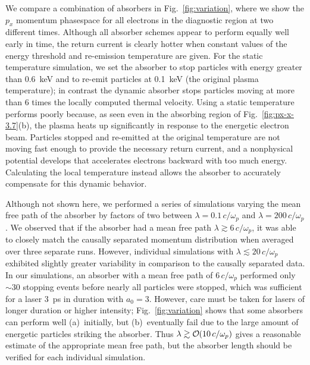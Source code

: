 \documentclass[../absorber.tex]{subfiles}
\begin{document}
We compare a combination of absorbers in Fig.~\ref{fig:variation}, where we show the $p_x$ momentum phasespace for all electrons in the diagnostic region at two different times.  Although all absorber schemes appear to perform equally well early in time, the return current is clearly hotter when constant values of the energy threshold and re-emission temperature are given.  For the static temperature simulation, we set the absorber to stop particles with energy greater than 0.6~keV and to re-emit particles at 0.1~keV (the original plasma temperature); in contrast the dynamic absorber stops particles moving at more than 6 times the locally computed thermal velocity.  Using a static temperature performs poorly because, as seen even in the absorbing region of Fig.~\ref{fig:px-x-3.7}(b), the plasma heats up significantly in response to the energetic electron beam.  Particles stopped and re-emitted at the original temperature are not moving fast enough to provide the necessary return current, and a nonphysical potential develops that accelerates electrons backward with too much energy.  Calculating the local temperature instead allows the absorber to accurately compensate for this dynamic behavior.

Although not shown here, we performed a series of simulations varying the mean free path of the absorber by factors of two between $\lambda=0.1\,c/\omega_p$ and $\lambda=200\,c/\omega_p$.  We observed that if the absorber had a mean free path $\lambda \gtrsim 6\,c/\omega_p$, it was able to closely match the causally separated momentum distribution when averaged over three separate runs.  However, individual simulations with $\lambda \lesssim 20\,c/\omega_p$ exhibited slightly greater variability in comparison to the causally separated data.  In our simulations, an absorber with a mean free path of $6\,c/\omega_p$ performed only $\sim30$ stopping events before nearly all particles were stopped, which was sufficient for a laser 3~ps in duration with $a_0=3$.  However, care must be taken for lasers of longer duration or higher intensity; Fig.~\ref{fig:variation} shows that some absorbers can perform well (a)~initially, but (b)~eventually fail due to the large amount of energetic particles striking the absorber.  Thus $\lambda \gtrsim \bigO(10\,c/\omega_p)$ gives a reasonable estimate of the appropriate mean free path, but the absorber length should be verified for each individual simulation.

\end{document}
